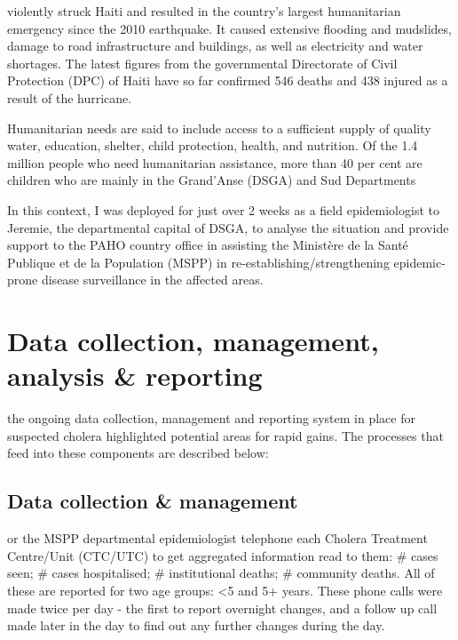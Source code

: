 \documentclass[]{tufte-handout}
\begin{document}
 violently struck Haiti and
resulted in the country's largest humanitarian emergency since the 2010
earthquake. It caused extensive flooding and mudslides, damage to road
infrastructure and buildings, as well as electricity and water
shortages. The latest figures from the governmental Directorate of Civil
Protection (DPC) of Haiti have so far confirmed 546 deaths and 438
injured as a result of the hurricane.

Humanitarian needs are said to include access to a sufficient supply of
quality water, education, shelter, child protection, health, and
nutrition. Of the 1.4 million people who need humanitarian assistance,
more than 40 per cent are children who are mainly in the Grand'Anse
(DSGA) and Sud Departments

In this context, I was deployed for just over 2 weeks as a field
epidemiologist to Jeremie, the departmental capital of DSGA, to analyse
the situation and provide support to the PAHO country office in
assisting the Ministère de la Santé Publique et de la Population (MSPP)
in re-establishing/strengthening epidemic-prone disease surveillance in
the affected areas.

\section{Data collection, management, analysis \&
reporting}\label{data-collection-management-analysis-reporting}

 the ongoing data collection,
management and reporting system in place for suspected cholera
highlighted potential areas for rapid gains. The processes that feed
into these components are described below:

\subsection{Data collection \&
management}\label{data-collection-management}

 or the MSPP
departmental epidemiologist telephone each Cholera Treatment Centre/Unit
(CTC/UTC) to get aggregated information read to them: \# cases seen; \#
cases hospitalised; \# institutional deaths; \# community deaths. All of
these are reported for two age groups: \textless{}5 and 5+ years. These
phone calls were made twice per day - the first to report overnight
changes, and a follow up call made later in the day to find out any
further changes during the day.
\end{document}
